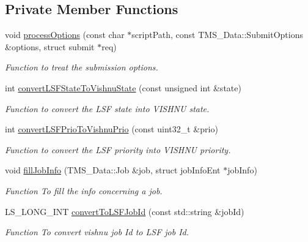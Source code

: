 \subsection*{Private Member Functions}
\begin{DoxyCompactItemize}
\item 
void \hyperlink{classLSFServer_a2c772126004cc986ac63b9bc90c94889}{processOptions} (const char $\ast$scriptPath, const TMS\_\-Data::SubmitOptions \&options, struct submit $\ast$req)
\begin{DoxyCompactList}\small\item\em Function to treat the submission options. \item\end{DoxyCompactList}\item 
int \hyperlink{classLSFServer_a23f1ca41a10204e34f9c507a9db10c21}{convertLSFStateToVishnuState} (const unsigned int \&state)
\begin{DoxyCompactList}\small\item\em Function to convert the LSF state into VISHNU state. \item\end{DoxyCompactList}\item 
int \hyperlink{classLSFServer_ad46f252c5f4f1a4413951365137e3b7f}{convertLSFPrioToVishnuPrio} (const uint32\_\-t \&prio)
\begin{DoxyCompactList}\small\item\em Function to convert the LSF priority into VISHNU priority. \item\end{DoxyCompactList}\item 
void \hyperlink{classLSFServer_a136de918eee609feb038d90de88d2a50}{fillJobInfo} (TMS\_\-Data::Job \&job, struct jobInfoEnt $\ast$jobInfo)
\begin{DoxyCompactList}\small\item\em Function To fill the info concerning a job. \item\end{DoxyCompactList}\item 
LS\_\-LONG\_\-INT \hyperlink{classLSFServer_a7e1f305914ec1222cf23efad1da5cfc1}{convertToLSFJobId} (const std::string \&jobId)
\begin{DoxyCompactList}\small\item\em Function To convert vishnu job Id to LSF job Id. \item\end{DoxyCompactList}\item 

\end{DoxyCompactItemize}
